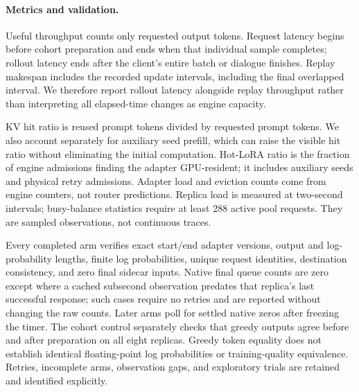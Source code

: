 \paragraph{Metrics and validation.}
Useful throughput counts only requested output tokens. Request latency begins
before cohort preparation and ends when that individual sample completes;
rollout latency ends after the client's entire batch or dialogue finishes.
Replay makespan includes the recorded update intervals, including the final
overlapped interval. We therefore report rollout latency alongside replay
throughput rather than interpreting all elapsed-time changes as engine capacity.

KV hit ratio is reused prompt tokens divided by requested prompt tokens.
We also account separately for auxiliary seed prefill, which can raise the
visible hit ratio without eliminating the initial computation. Hot-LoRA ratio
is the fraction of engine admissions finding the adapter GPU-resident; it
includes auxiliary seeds and physical retry admissions. Adapter load and
eviction counts come from engine counters, not router predictions. Replica load
is measured at two-second intervals; busy-balance statistics require at least
288 active pool requests. They are sampled observations, not continuous traces.

Every completed arm verifies exact start/end adapter versions, output and
log-probability lengths, finite log probabilities, unique request identities,
destination consistency, and zero final sidecar inputs. Native final queue
counts are zero except where a cached subsecond observation predates that
replica's last successful response; such cases require no retries and are
reported without changing the raw counts. Later arms poll for settled native
zeros after freezing the timer. The cohort control separately
checks that greedy outputs agree before and after preparation on all eight
replicas. Greedy token equality does not establish identical floating-point
log probabilities or training-quality equivalence. Retries, incomplete arms,
observation gaps, and exploratory trials are retained and identified explicitly.
